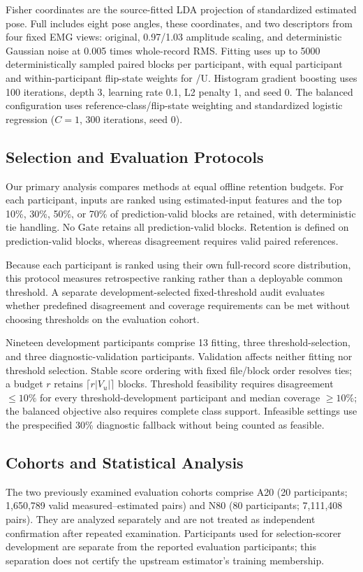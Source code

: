Fisher coordinates are the source-fitted LDA projection of standardized estimated pose. Full includes eight pose angles, these coordinates, and two descriptors from four fixed EMG views: original, 0.97/1.03 amplitude scaling, and deterministic Gaussian noise at 0.005 times whole-record RMS. Fitting uses up to 5000 deterministically sampled paired blocks per participant, with equal participant and within-participant flip-state weights for /U. Histogram gradient boosting uses 100 iterations, depth 3, learning rate 0.1, L2 penalty 1, and seed 0. The balanced configuration uses reference-class/flip-state weighting and standardized logistic regression (\(C=1\), 300 iterations, seed 0).



\subsection{Selection and Evaluation Protocols}\label{selection-and-evaluation-protocols}
Our primary analysis compares methods at equal offline retention budgets. For each participant, inputs are ranked using estimated-input features and the top 10\%, 30\%, 50\%, or 70\% of prediction-valid blocks are retained, with deterministic tie handling. No Gate retains all prediction-valid blocks. Retention is defined on prediction-valid blocks, whereas disagreement requires valid paired references.

Because each participant is ranked using their own full-record score distribution, this protocol measures retrospective ranking rather than a deployable common threshold. A separate development-selected fixed-threshold audit evaluates whether predefined disagreement and coverage requirements can be met without choosing thresholds on the evaluation cohort.

Nineteen development participants comprise 13 fitting, three threshold-selection, and three diagnostic-validation participants. Validation affects neither fitting nor threshold selection. Stable score ordering with fixed file/block order resolves ties; a budget \(r\) retains \(\lceil r|V_u|\rceil\) blocks. Threshold feasibility requires disagreement \(\leq10\%\) for every threshold-development participant and median coverage \(\geq10\%\); the balanced objective also requires complete class support. Infeasible settings use the prespecified 30\% diagnostic fallback without being counted as feasible.

\subsection{Cohorts and Statistical Analysis}\label{cohorts-and-statistical-analysis}
The two previously examined evaluation cohorts comprise A20 (20 participants; 1,650,789 valid measured--estimated pairs) and N80 (80 participants; 7,111,408 pairs). They are analyzed separately and are not treated as independent confirmation after repeated examination. Participants used for selection-scorer development are separate from the reported evaluation participants; this separation does not certify the upstream estimator's training membership.

